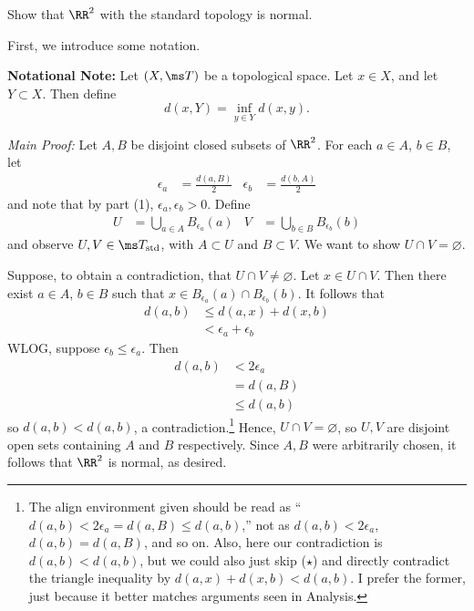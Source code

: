 \documentclass{fkpset}
\newcommand{\tstd}{\ensuremath \ms T_{\rm std}}
\begin{document}
\pagestyle{plain}
\pagestyle{fancy}
  \pointstable{}

  \vspace{1cm}

  \begin{problem}[5.6(4)]
    Show that $\RR^2$ with the standard topology is normal.
  \end{problem}
  \begin{solution}
    First, we introduce some notation.
    \begin{leftbar}
      \textbf{Notational Note:} Let $(X, \ms T)$ be a topological
      space. Let $x \in X$, and let $Y \subset X$. Then define
      \[
        d(x, Y) = \inf_{y \in Y} d(x,y).
      \]
    \end{leftbar}

    \emph{Main Proof:} Let $A,B$ be disjoint closed subsets of
    $\RR^2$. For each $a\in A$, $b\in B$, let
    \begin{align*}
      \epsilon_a &= \frac{d(a,B)}{2} & \epsilon_b &= \frac{d(b,A)}{2}
    \end{align*}
    and note that by part (1), $\epsilon_a, \epsilon_b > 0$. Define
    \begin{align*}
      U &= \bigcup_{a \in A} B_{\epsilon_a}(a) & V &= \bigcup_{b \in B} B_{\epsilon_b}(b)
    \end{align*}
    and observe $U, V \in \tstd$, with $A \subset U$ and $B \subset
    V$. We want to show $U \cap V = \varnothing$.

    Suppose, to obtain a contradiction, that $U \cap V \neq
    \varnothing$. Let $x \in U \cap V$. Then there exist $a \in A$, $b
    \in B$ such that $x \in B_{\epsilon_a}(a) \cap B_{\epsilon_b}(b)$.
    It follows that
    \begin{align*}
      d(a,b)
      &\leq d(a,x) + d(x,b) \tag{$\star$}\\
      &< \epsilon_a + \epsilon_b
    \end{align*}
    WLOG, suppose $\epsilon_b \leq \epsilon_a$. Then
    \begin{align*}
      d(a,b)
      &< 2\epsilon_a \\
      &= d(a,B)  \\
      &\leq d(a,b)
    \end{align*}
    so $d(a,b) < d(a,b)$, a contradiction.\footnote{The align
      environment given should be read as ``$d(a,b) < 2\epsilon_a =
      d(a,B) \leq d(a,b)$,'' not as $d(a,b) < 2\epsilon_a$, $d(a,b) =
      d(a,B)$, and so on. Also, here our contradiction is $d(a,b) <
      d(a,b)$, but we could also just skip ($\star$) and directly
      contradict the triangle inequality by $d(a,x) + d(x,b) <
      d(a,b)$. I prefer the former, just because it better matches
      arguments seen in Analysis.}
    Hence, $U \cap V = \varnothing$, so $U,V$ are disjoint open sets
    containing $A$ and $B$ respectively. Since $A,B$ were arbitrarily
    chosen, it follows that $\RR^2$ is normal, as desired.
  \end{solution}
  \clearpage
\end{document}
